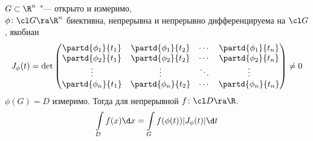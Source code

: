 \begin{theorem}
	$G \subset \R^n$ "--- открыто и измеримо,\\
	$\phi\colon \cl G \ra \R^n$ биективна, непрерывна и непрерывно дифференцируема на $\cl G$,
	якобиан
	\[
		J_\phi(t) = \det
		\begin{pmatrix}
			\partd{\phi_1}{t_1} & \partd{\phi_1}{t_2} & \cdots & \partd{\phi_1}{t_n} \\
			\partd{\phi_2}{t_1} & \partd{\phi_2}{t_2} & \cdots & \partd{\phi_2}{t_n} \\
			\vdots              & \vdots              & \ddots & \vdots              \\
			\partd{\phi_n}{t_1} & \partd{\phi_n}{t_2} & \cdots & \partd{\phi_n}{t_n} \\
		\end{pmatrix} \ne 0
	\]
	$\phi(G) = D$ измеримо.
	Тогда для непрерывной $f\colon \cl D \ra \R$.
	\[
		\int\limits_D f(x) \d x = \int\limits_G f(\phi(t)) |J_\phi(t)| \d t
	\]
\end{theorem}
